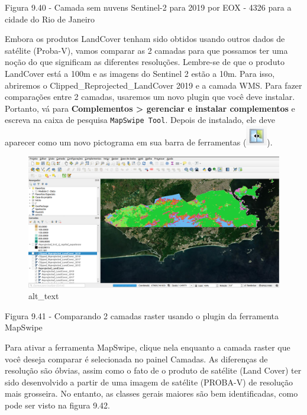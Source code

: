 \documentclass[
  portuguese,
]{krantz}
\begin{document}
Figura 9.40 - Camada sem nuvens Sentinel-2 para 2019 por EOX - 4326 para a cidade do Rio de Janeiro

Embora os produtos LandCover tenham sido obtidos usando outros dados de satélite (Proba-V), vamos comparar as 2 camadas para que possamos ter uma noção do que significam as diferentes resoluções. Lembre-se de que o produto LandCover está a 100m e as imagens do Sentinel 2 estão a 10m. Para isso, abriremos o Clipped\_Reprojected\_LandCover 2019 e a camada WMS. Para fazer comparações entre 2 camadas, usaremos um novo plugin que você deve instalar. Portanto, vá para \textbf{Complementos \textgreater{} gerenciar e instalar complementos} e escreva na caixa de pesquisa \texttt{MapSwipe\ Tool}. Depois de instalado, ele deve aparecer como um novo pictograma em sua barra de ferramentas (\includegraphics{media/modulo9/mapswipe-btn.png}).

\begin{figure}
\centering
\includegraphics{media/modulo9/fig941.png}
\caption{alt\_text}
\end{figure}

Figura 9.41 - Comparando 2 camadas raster usando o plugin da ferramenta MapSwipe

Para ativar a ferramenta MapSwipe, clique nela enquanto a camada raster que você deseja comparar é selecionada no painel Camadas. As diferenças de resolução são óbvias, assim como o fato de o produto de satélite (Land Cover) ter sido desenvolvido a partir de uma imagem de satélite (PROBA-V) de resolução mais grosseira. No entanto, as classes gerais maiores são bem identificadas, como pode ser visto na figura 9.42.
\end{document}
